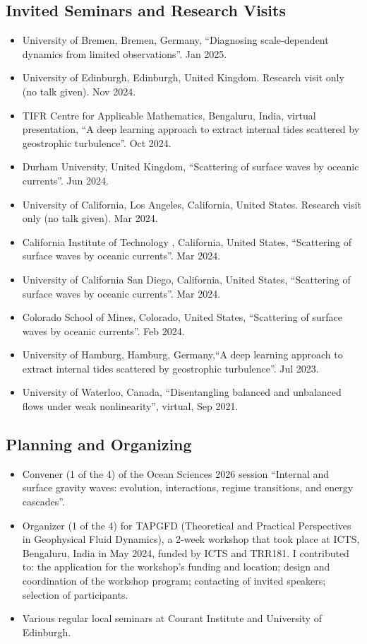 \documentclass[a4paper,12pt]{article}
\begin{document}
\subsection{Invited Seminars and Research Visits }
\begin{itemize}[leftmargin=*,noitemsep]
\item University of Bremen, Bremen, Germany, ``Diagnosing scale-dependent dynamics from limited observations”. Jan 2025.
\item University of Edinburgh, Edinburgh, United Kingdom. Research visit only (no talk given). Nov 2024.
\item TIFR Centre for Applicable Mathematics, Bengaluru, India, virtual presentation, ``A deep learning approach to extract internal tides scattered by geostrophic turbulence”. Oct 2024.
\item Durham University, United Kingdom, ``Scattering of surface waves by oceanic currents”. Jun 2024.
\item University of California, Los Angeles, California, United States. Research visit only (no talk given). Mar 2024.
\item California Institute of Technology , California, United States, ``Scattering of surface waves by oceanic currents”. Mar 2024.
\item University of California San Diego, California, United States, ``Scattering of surface waves by oceanic currents”. Mar 2024.
\item Colorado School of Mines, Colorado, United States, ``Scattering of surface waves by oceanic currents”. Feb 2024.
\item University of Hamburg, Hamburg, Germany,``A deep learning approach to extract internal tides scattered by geostrophic turbulence”. Jul 2023.
\item University of Waterloo, Canada, ``Disentangling balanced and unbalanced flows under weak nonlinearity”, virtual,  Sep 2021.
\end{itemize}

\subsection{Planning and Organizing}
\begin{itemize}[leftmargin=*,noitemsep]
\item Convener (1 of the 4) of the Ocean Sciences 2026 session ``Internal and surface gravity waves: evolution, interactions, regime transitions, and energy cascades''. 
\item Organizer  (1 of the 4) for TAPGFD (Theoretical and Practical Perspectives in Geophysical Fluid Dynamics), a 2-week workshop that took place at ICTS,  Bengaluru, India in May 2024, funded by ICTS and TRR181. I contributed to: the application for the workshop’s funding and location; design and coordination of the workshop program; contacting of invited speakers; selection of participants. 
\item Various regular local seminars at Courant Institute and University of Edinburgh.
\end{itemize}
\end{document}
